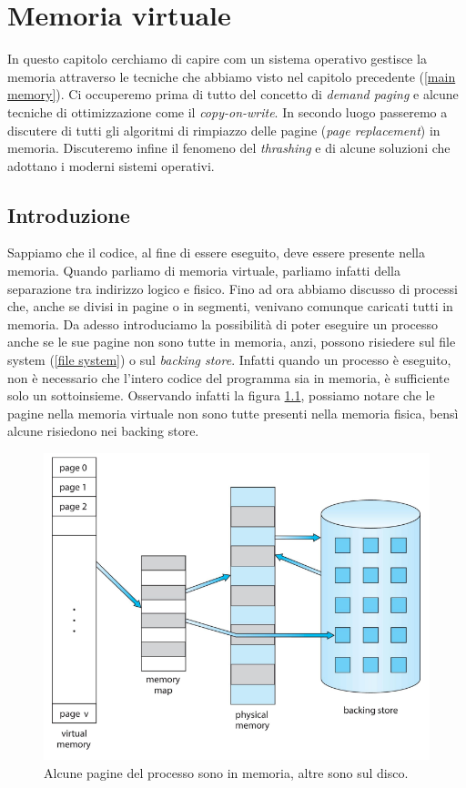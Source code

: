 \pagebreak
\chapter{Memoria virtuale}\label{virtual memory}
In questo capitolo cerchiamo di capire com un sistema operativo gestisce la memoria attraverso le tecniche che abbiamo visto nel capitolo precedente (\ref{main memory}). Ci occuperemo prima di tutto del concetto di \textit{demand paging} e alcune tecniche di ottimizzazione come il \textit{copy-on-write}. In secondo luogo passeremo a discutere di tutti gli algoritmi di rimpiazzo delle pagine (\textit{page replacement}) in memoria. Discuteremo infine il fenomeno del \textit{thrashing} e di alcune soluzioni che adottano i moderni sistemi operativi.

% 
\section{Introduzione}
Sappiamo che il codice, al fine di essere eseguito, deve essere presente nella memoria. Quando parliamo di memoria virtuale, parliamo infatti della separazione tra indirizzo logico e fisico. Fino ad ora abbiamo discusso di processi che, anche se divisi in pagine o in segmenti, venivano comunque caricati tutti in memoria. Da adesso introduciamo la possibilità di poter eseguire un processo anche se le sue pagine non sono tutte in memoria, anzi, possono risiedere sul file system (\ref{file system}) o sul \textit{backing store}. Infatti quando un processo è eseguito, non è necessario che l'intero codice del programma sia in memoria, è sufficiente solo un sottoinsieme. Osservando infatti la figura \ref{fig:virtual_memory}, possiamo notare che le pagine nella memoria virtuale non sono tutte presenti nella memoria fisica, bensì alcune risiedono nei backing store.
\begin{figure}[h]
    \centering
    \includegraphics[width = .6\textwidth]{../res/imgs/virtual memory/virtual_memory.png}
    \caption{Alcune pagine del processo sono in memoria, altre sono sul disco.}
    \label{fig:virtual_memory}
\end{figure}

